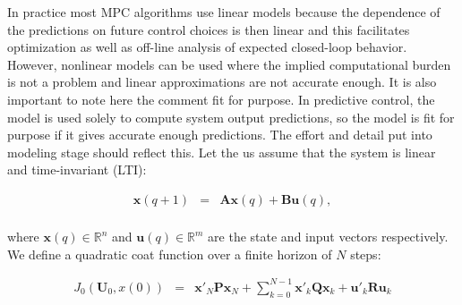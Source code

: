 	\label{BASICCSR:sec:LQR}

In practice most MPC algorithms use linear models because the dependence of the predictions on future control choices is then linear and this facilitates optimization as well as off-line analysis of expected closed-loop behavior. However, nonlinear models can be used where the implied computational burden is not a problem and linear approximations are not accurate enough. It is also important to note here the comment fit for purpose. In predictive control, the model is used solely to compute system output predictions, so the model is fit for purpose if it gives accurate enough predictions. The effort and detail put into modeling stage should reflect this.	Let the us assume that the system is linear and time-invariant (LTI):
	
	    \begin{equation}
        \begin{array}{rcl}
            \textbf{x}(q+1)&=&\textbf{Ax}(q)+\textbf{Bu}(q),\\
        \end{array}
        \label{BASICMPC:equ:basic_LTI}
    \end{equation}

    where $\textbf{x}(q)\in\mathbb{R}^n$ and $\textbf{u}(q)\in\mathbb{R}^m$ are the state and input vectors respectively. We define a quadratic coat function over a finite horizon of $N$ steps:




\begin{equation}
        \begin{array}{rcl}
         J_0(\textbf{U}_0,x(0))&=&\textbf{x}'_N\textbf{P}\textbf{x}_N+\sum^{N-1}_{k=0}\textbf{x}'_k\textbf{Q}\textbf{x}_k+\textbf{u}'_k\textbf{R}\textbf{u}_k\\
        \end{array}
        \label{BASICMPC:equ:cost_function_Euclidian}
    \end{equation}

